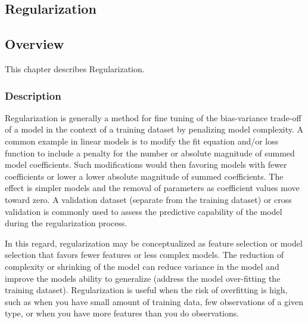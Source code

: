 

\renewcommand{\bibsection}{\subsection{\bibname}}
\begin{bibunit}

\chapter{Regularization}
\label{ch:regularization}

\section{Overview}
This chapter describes Regularization.

\subsection{Description}
Regularization is generally a method for fine tuning of the bias-variance trade-off of a model in the context of a training dataset by penalizing model complexity.
A common example in linear models is to modify the fit equation and/or loss function to include a penalty for the number or absolute magnitude of summed model coefficients. Such modifications would then favoring models with fewer coefficients or lower a lower absolute magnitude of summed coefficients. The effect is simpler models and the removal of parameters as coefficient values move toward zero. A validation dataset (separate from the training dataset) or cross validation is commonly used to assess the predictive capability of the model during the regularization process.

In this regard, regularization may be conceptualized as feature selection or model selection that favors fewer features or less complex models. The reduction of complexity or shrinking of the model can reduce variance in the model and improve the models ability to generalize (address the model over-fitting the training dataset). 
Regularization is useful when the risk of overfitting is high, such as when you have small amount of training data, few observations of a given type, or when you have more features than you do observations.


\end{bibunit}
